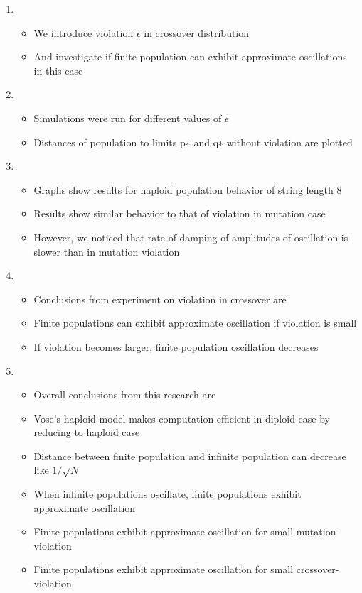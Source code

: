 \documentclass{article}
\begin{document}
\begin{enumerate}
\item
  \begin{itemize}
  \item We introduce violation $\epsilon$ in crossover distribution
  
  \item And investigate if finite population can exhibit approximate oscillations in this case     
  \end{itemize}
  
\item
  \begin{itemize}
  \item Simulations were run for different values of $\epsilon$
  \item Distances of population to limits p∗ and q∗ without violation are plotted  
  \end{itemize}
  
\item
  \begin{itemize}
  \item Graphs show results for haploid population behavior of string length 8
  \item Results show similar behavior to that of violation in mutation case
  \item However, we noticed that rate of damping of amplitudes of oscillation is slower than in mutation violation 
  
  \end{itemize}  

  
\item
  \begin{itemize}
  \item Conclusions from experiment on violation in crossover are 
  \item Finite populations can exhibit approximate oscillation if violation is small
  \item If violation becomes larger, finite population oscillation decreases
  \end{itemize}
  
\item
  \begin{itemize}
  \item Overall conclusions from this research are
  \item Vose's haploid model makes computation efficient in diploid case by reducing to haploid case 
  \item Distance between finite population and infinite population can decrease like $1/\sqrt{N}$
  \item When infinite populations oscillate, finite populations exhibit approximate oscillation
  \item Finite populations exhibit approximate oscillation for small mutation-violation
  \item Finite populations exhibit approximate oscillation for small crossover-violation        
  \end{itemize}
  

\end{enumerate}
\end{document}
